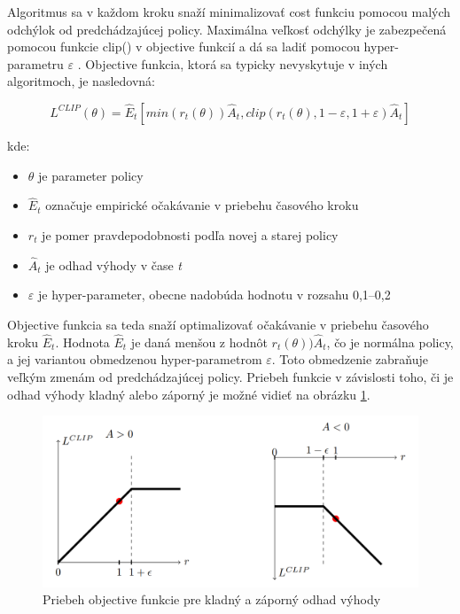 \documentclass[slovak, master]{diploma}
\begin{document}
Algoritmus sa v každom kroku snaží minimalizovať cost funkciu pomocou malých odchýlok od predchádzajúcej policy. Maximálna veľkosť odchýlky je zabezpečená pomocou funkcie clip() v objective funkcií a dá sa ladiť pomocou hyper-parametru \(\varepsilon\) \cite{PPOPaper}. Objective funkcia, ktorá sa typicky nevyskytuje v iných algoritmoch, je nasledovná:

\[L^{CLIP}(\theta) = \hat{E}_t [min(r_t(\theta))\hat{A}_t, clip(r_t(\theta), 1 - \varepsilon, 1 + \varepsilon)\hat{A}_t]\]

kde:
\begin{itemize}
  \item \(\theta\) je parameter policy
  \item \(\hat{E}_t\) označuje empirické očakávanie v priebehu časového kroku
  \item \(r_t\) je pomer pravdepodobnosti podľa novej a starej policy
  \item \(\hat{A}_t\) je odhad výhody v čase \textit{t}
  \item \(\varepsilon\) je hyper-parameter, obecne nadobúda hodnotu v rozsahu 0,1--0,2
\end{itemize}

Objective funkcia sa teda snaží optimalizovať očakávanie v priebehu časového kroku \(\hat{E}_t\). Hodnota \(\hat{E}_t\) je daná menšou z hodnôt \(r_t(\theta))\hat{A}_t\), čo je normálna policy, a jej variantou obmedzenou hyper-parametrom \(\varepsilon\). Toto obmedzenie zabraňuje veľkým zmenám od predchádzajúcej policy. Priebeh funkcie v závislosti toho, či je odhad výhody kladný alebo záporný je možné vidieť na obrázku \ref{pic:clipping}.

\begin{figure}[!htbp]
    \centering
    \includegraphics[width=.7\textwidth]{Figures/clip.png}
    \caption{Priebeh objective funkcie pre kladný a záporný odhad výhody \cite{PPOPaper}}
    \label{pic:clipping}
\end{figure}

\end{document}
